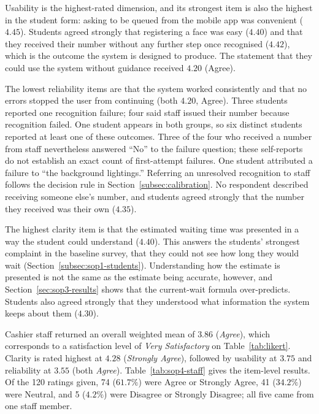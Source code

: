 \documentclass{research}
\begin{document}
Usability is the highest-rated dimension, and its
strongest item is also the highest in the student form: asking to be
queued from the mobile app was convenient ($4.45$). Students agreed
strongly that registering a face was easy ($4.40$) and that they received
their number without any further step once recognised ($4.42$), which
is the outcome the system is designed to produce. The statement that
they could use the system without guidance received $4.20$ (Agree).

The lowest reliability items are that the system
worked consistently and that no errors stopped the user from continuing
(both $4.20$, Agree). Three students reported one recognition failure;
four said staff issued their number because recognition failed. One
student appears in both groups, so six distinct students reported at
least one of these outcomes. Three of the four who received a number
from staff nevertheless answered ``No'' to the failure question; these
self-reports do not establish an exact count of first-attempt failures.
One student attributed a failure to ``the background lightings.''
Referring an unresolved recognition to staff follows the decision rule
in Section~\ref{subsec:calibration}. No respondent described receiving
someone else's number, and students agreed strongly that the number
they received was their own ($4.35$).

The highest clarity item is that the estimated waiting
time was presented in a way the student could understand ($4.40$). This
answers the students' strongest complaint in the baseline survey, that
they could not see how long they would wait
(Section~\ref{subsec:sop1-students}). Understanding how the estimate is
presented is not the same as the estimate being accurate, however, and
Section~\ref{sec:sop3-results} shows that the current-wait formula
over-predicts. Students also agreed strongly that they understood what
information the system keeps about them ($4.30$).

\label{subsec:sop4-staff}

Cashier staff returned an overall weighted mean of $3.86$
(\emph{Agree}), which corresponds to a satisfaction level of \emph{Very
Satisfactory} on Table~\ref{tab:likert}. Clarity is rated highest at
$4.28$ (\emph{Strongly Agree}), followed by usability at $3.75$ and
reliability at $3.55$ (both \emph{Agree}).
Table~\ref{tab:sop4-staff} gives the item-level results. Of the 120
ratings given, 74 ($61.7\%$) were Agree or Strongly Agree, 41 ($34.2\%$)
were Neutral, and 5 ($4.2\%$) were Disagree or Strongly Disagree; all
five came from one staff member.
\end{document}
